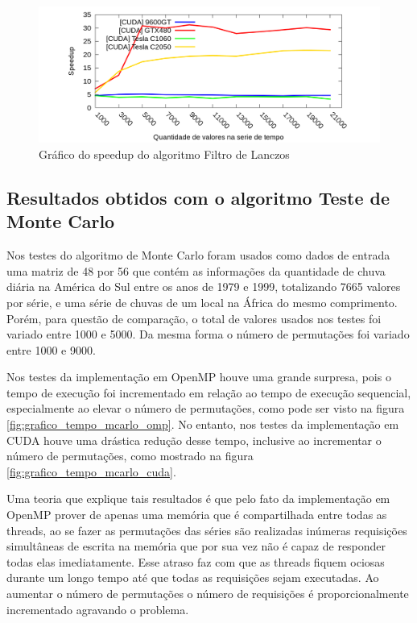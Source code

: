 \begin{figure}[H]
\centering
\includegraphics[width=1.0\textwidth]{Imagens/graficos_lanczos/lanczos_speedup_cuda.png}
\caption{Gráfico do speedup do algoritmo Filtro de Lanczos}
\label{fig:grafico_speedup_lanczos_cuda}
\end{figure}

\subsection{Resultados obtidos com o algoritmo Teste de Monte Carlo}

Nos testes do algoritmo de Monte Carlo foram usados como dados de entrada uma matriz de 48 por 56 que contém as informações da quantidade de chuva diária na América do Sul entre os anos de 1979 e 1999, totalizando 7665 valores por série, e uma série de chuvas de um local na África do mesmo comprimento.
Porém, para questão de comparação, o total de valores usados nos testes foi variado entre 1000 e 5000. Da mesma forma o número de permutações foi variado entre 1000 e 9000.

Nos testes da implementação em OpenMP houve uma grande surpresa, pois o tempo de execução foi incrementado em relação ao tempo de execução sequencial, especialmente ao elevar o número de permutações, como pode ser visto na figura \ref{fig:grafico_tempo_mcarlo_omp}. No entanto, nos testes da implementação em CUDA houve uma drástica redução desse tempo, inclusive ao incrementar o número de permutações, como mostrado na figura \ref{fig:grafico_tempo_mcarlo_cuda}.

Uma teoria que explique tais resultados é que pelo fato da implementação em OpenMP prover de apenas uma memória que é compartilhada entre todas as threads, ao se fazer as permutações das séries são realizadas inúmeras requisições simultâneas de escrita na memória que por sua vez não é capaz de responder todas elas imediatamente. Esse atraso faz com que as threads fiquem ociosas durante um longo tempo até que todas as requisições sejam executadas. Ao aumentar o número de permutações o número de requisições é proporcionalmente incrementado agravando o problema.


